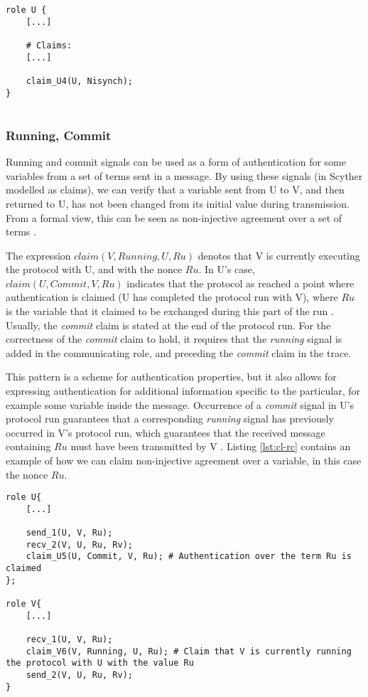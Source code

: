 \begin{lstlisting}[caption={Claim for declaring non-injective synchronization in Scyther.}, label={lst:cl-synch}]
role U {
	[...]

	# Claims:	
	[...]
	
	claim_U4(U, Nisynch);
}


\end{lstlisting}



\subsubsection{Running, Commit}

Running and commit signals can be used as a form of authentication for some variables from a set of terms sent in a message. By using these signals (in Scyther modelled as claims), we can verify that a variable sent from U to V, and then returned to U, has not been changed from its initial value during transmission. From a formal view, this can be seen as non-injective agreement over a set of terms \cite{scyther-manual}.

The expression $claim(V, Running, U, Ru)$ denotes that V is currently executing the protocol with U, and with the nonce $Ru$. In U's case, $claim(U, Commit, V, Ru)$ indicates that the protocol as reached a point where authentication is claimed (U has completed the protocol run with V), where $Ru$ is the variable that it claimed to be exchanged during this part of the run \cite{ryan2001modelling}. Usually, the \emph{commit} claim is stated at the end of the protocol run. For the correctness of the \emph{commit} claim to hold, it requires that the \emph{running} signal is added in the communicating role, and preceding the \emph{commit} claim in the trace.

This pattern is a scheme for authentication properties, but it also allows for expressing authentication for additional information specific to the particular, for example some variable inside the message. Occurrence of a \emph{commit} signal in U's protocol run guarantees that a corresponding \emph{running} signal has previously occurred in V's protocol run, which guarantees that the received message containing $Ru$ must have been transmitted by V \cite{ryan2001modelling}. Listing \ref{lst:cl-rc} contains an example of how we can claim non-injective agreement over a variable, in this case the nonce $Ru$. 
\newline
\newpage
\begin{lstlisting}[caption={Example of a running, commit claim in Scyther to provide authentication for a set of terms.}, label={lst:cl-rc}]
role U{
	[...]
	
	send_1(U, V, Ru);
	recv_2(V, U, Ru, Rv);
	claim_U5(U, Commit, V, Ru); # Authentication over the term Ru is claimed
};

role V{
	[...]
	
	recv_1(U, V, Ru);
	claim_V6(V, Running, U, Ru); # Claim that V is currently running the protocol with U with the value Ru
	send_2(V, U, Ru, Rv); 
}
\end{lstlisting}

